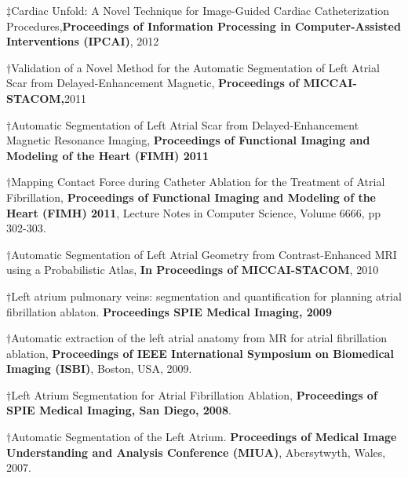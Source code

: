 \begin{etaremune}
	\item $\ddagger$Cardiac Unfold: A Novel Technique for Image-Guided Cardiac Catheterization Procedures,\textbf{Proceedings of Information Processing in Computer-Assisted Interventions (IPCAI)}, 2012
	\item $\dagger$Validation of a Novel Method for the Automatic Segmentation of Left Atrial Scar from Delayed-Enhancement Magnetic, \textbf{Proceedings of MICCAI-STACOM,}2011
	\item $\dagger$Automatic Segmentation of Left Atrial Scar from Delayed-Enhancement Magnetic Resonance Imaging, \textbf{Proceedings of Functional Imaging and Modeling of the Heart (FIMH) 2011}
	\item $\dagger$Mapping Contact Force during Catheter Ablation for the Treatment of Atrial Fibrillation, \textbf{Proceedings of Functional Imaging and Modeling of the Heart (FIMH) 2011}, Lecture Notes in Computer Science,  Volume 6666, pp 302-303. 
	\item $\dagger$Automatic Segmentation of Left Atrial Geometry from Contrast-Enhanced MRI using a Probabilistic Atlas, \textbf{In Proceedings of MICCAI-STACOM}, 2010
	\item $\dagger$Left atrium pulmonary veins: segmentation and quantification for planning atrial fibrillation ablaton. \textbf{Proceedings SPIE Medical Imaging, 2009} 
	\item $\dagger$Automatic extraction of the left atrial anatomy from MR for atrial fibrillation ablation, \textbf{Proceedings of IEEE International Symposium on Biomedical Imaging (ISBI)}, Boston, USA, 2009. 
	\item $\dagger$Left Atrium Segmentation for Atrial Fibrillation Ablation, \textbf{Proceedings of SPIE Medical Imaging, San Diego, 2008}. 
	\item $\dagger$Automatic Segmentation of the Left Atrium. \textbf{Proceedings of Medical Image Understanding and Analysis Conference (MIUA)}, Abersytwyth, Wales, 2007. 
\end{etaremune}

